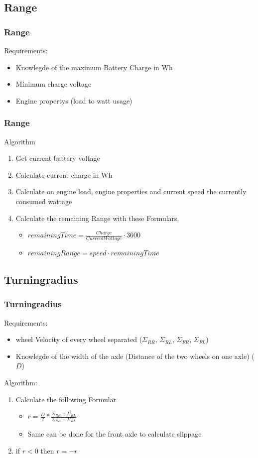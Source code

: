 \documentclass{beamer}
\begin{document}
\subsection{Range}
\begin{frame}
    \frametitle{Range}
    Requirements:
    \begin{itemize}
        \item Knowlegde of the maximum Battery Charge in Wh
        \item Minimum charge voltage
        \item Engine propertys (load to watt usage)
    \end{itemize}
\end{frame}
\begin{frame}
    \frametitle{Range}
    Algorithm
    \begin{enumerate}
     \item Get current battery voltage
     \item Calculate current charge in Wh
     \item Calculate on engine load, engine properties and current speed the currently consumed wattage
     \item Calculate the remaining Range with these Formulars.
     \begin{itemize}
        \item $remainingTime=\frac{Charge}{Current Wattage}\cdot3600$
        \item $remainingRange=speed\cdot remainingTime$
     \end{itemize}
    \end{enumerate}
\end{frame}

\subsection{Turningradius}
\begin{frame}
    \frametitle{Turningradius}
    Requirements:
    \begin{itemize}
     \item wheel Velocity of every wheel separated ($\Sigma_{RR}$, $\Sigma_{RL}$, $\Sigma_{FR}$, $\Sigma_{FL}$)
     \item Knowlegde of the width of the axle (Distance of the two wheels on one axle) ($D$)
    \end{itemize}
    Algorithm:
    \begin{enumerate}
     \item Calculate the following Formular
     \begin{itemize}
        \item $r=\frac{D}{2}*\frac{\Sigma_{RR}+\Sigma_{RL}}{\Sigma_{RR}-\Sigma_{RL}}$
        \item Same can be done for the front axle to calculate slippage
     \end{itemize}
     \item if $r<0$ then $r=-r$
    \end{enumerate}
\end{frame}
\end{document}
